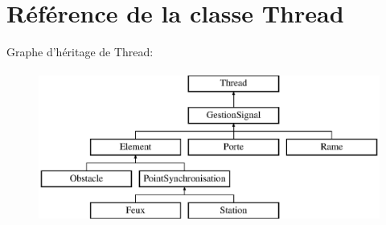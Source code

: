 \hypertarget{classThread}{
\section{Référence de la classe Thread}
\label{classThread}
}
Graphe d'héritage de Thread:\begin{figure}[H]
\begin{center}
\leavevmode
\includegraphics[height=5cm]{classThread}
\end{center}
\end{figure}
